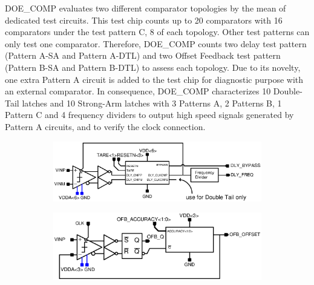 DOE\_COMP evaluates two different comparator topologies by the mean of dedicated test circuits. This test chip counts up to 20 comparators with 16 comparators under the test pattern C, 8 of each topology. Other test patterns can only test one comparator. Therefore, DOE\_COMP counts two delay test pattern (Pattern A-SA and Pattern A-DTL) and two Offset Feedback test pattern (Pattern B-SA and Pattern B-DTL) to assess each topology. Due to its novelty, one extra Pattern A circuit is added to the test chip for diagnostic purpose with an external comparator. In consequence, DOE\_COMP characterizes 10 Double-Tail latches and 10 Strong-Arm latches with 3 Patterns A, 2 Patterns B, 1 Pattern C and 4 frequency dividers to output high speed signals generated by Pattern A circuits, and to verify the clock connection.

\begin{figure}[htp]
    \centering
    \begin{subfigure}[b]{0.5\textwidth}
        \includegraphics[width=\textwidth]{Chapter5/Figs/comp_test/test_delay_bloc_close_sa.ps}
    \end{subfigure}
    \begin{subfigure}[b]{0.5\textwidth}
        \includegraphics[width=\textwidth]{Chapter5/Figs/comp_test/test_offset_bloc_close_sa.ps}
    \end{subfigure}
    \begin{subfigure}[b]{0.75\textwidth}

\end{subfigure}
\end{figure}
